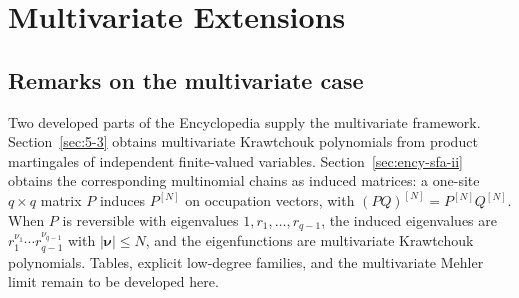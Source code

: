 \chapter{Multivariate Extensions}
\label{app:multivariate}
\section{Remarks on the multivariate case}
Two developed parts of the Encyclopedia supply the multivariate
framework. Section~\ref{sec:5-3} obtains multivariate Krawtchouk
polynomials from product martingales of independent finite-valued
variables. Section~\ref{sec:ency-sfa-ii} obtains the corresponding
multinomial chains as induced matrices: a one-site $q\times q$ matrix
$P$ induces $P^{[N]}$ on occupation vectors, with
$(PQ)^{[N]}=P^{[N]}Q^{[N]}$. When $P$ is reversible with eigenvalues
$1,r_1,\ldots,r_{q-1}$, the induced eigenvalues are
$r_1^{\nu_1}\cdots r_{q-1}^{\nu_{q-1}}$ with $|\boldsymbol\nu|\le N$,
and the eigenfunctions are multivariate Krawtchouk polynomials.
Tables, explicit low-degree families, and the multivariate Mehler limit
remain to be developed here.
